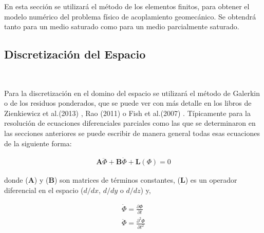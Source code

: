 En esta sección se utilizará el método de los elementos finitos, para obtener el modelo numérico del problema físico de acoplamiento geomecánico. Se obtendrá tanto para un medio saturado como para un medio parcialmente saturado.\bigskip

\subsection{Discretización del Espacio}~\hypertarget{sec:sec341}{}
\label{sec:sec341}

Para la discretización en el domino del espacio se utilizará el método de Galerkin o de los residuos ponderados, que se puede ver con más detalle en los libros de Zienkiewicz et al.(2013) \cite{Zienkiewicz2013TheFundamentals}, Rao (2011) \cite{Rao2011TheEngineering} o Fish et al.(2007) \cite{Fish2007AElements}. Típicamente para la resolución de ecuaciones diferenciales parciales como las que se determinaron en las secciones anteriores se puede escribir de manera general todas esas ecuaciones de la siguiente forma:

\begin{ceqn} %
\begin{gather}\label{eq:equ340}
\mathbf{A}\ddot{\Phi} + \mathbf{B}\dot{\Phi} + \mathbf{L}(\Phi) = 0
\end{gather}   
\end{ceqn}

donde ($\mathbf{A}$) y ($\mathbf{B}$) son matrices de términos constantes, ($\mathbf{L}$) es un operador diferencial en el espacio ($d/dx$, $d/dy$ o $d/dz$) y,

\begin{ceqn} 
\begin{subequations} \label{eq:equ341} 
\begin{gather}
\dot{\Phi}  = \frac{\partial \Phi}{\partial t} \label{eq:equ341a}\\[12pt]
\ddot{\Phi}  = \frac{\partial^2 \Phi}{\partial t^2}  \label{eq:equ341b}
\end{gather}  
\end{subequations} 
\end{ceqn}

